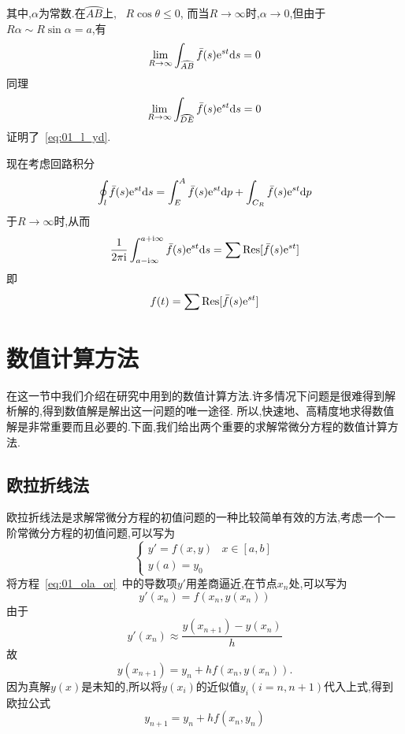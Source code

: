其中,$\alpha$为常数.在$\wideparen{AB}$上,
~$R\cos\theta\leq0$,
而当$R\to\infty$时,$\alpha\to0$,但由于$R\alpha\sim
R\sin\alpha=a$,有
\begin{equation*}
\lim_{R\to\infty}\int_{\wideparen{AB}}\bar{f}(s)\me^{st}\dif s=0
\end{equation*}
同理
\begin{equation*}
\lim_{R\to\infty}\int_{\wideparen{DE}}\bar{f}(s)\me^{st}\dif s=0
\end{equation*}
证明了~\eqref{eq:01_l_yd}.\par
现在考虑回路积分
\begin{equation*}
\oint_l\bar{f}(s)\mathrm{e}^{st}\mathrm{d} s=\int_E^A\bar{f}(s)\mathrm{e}^{st}\mathrm{d} p+\int_{C_R}\bar{f}(s)\mathrm{e}^{st}\mathrm{d} p
\end{equation*}
于$R\to\infty$时,从而
\begin{equation*}
 \dfrac{1}{2\pi\mathrm{i}}\int_{a-\mathrm{i}\infty}^{a+\mathrm{i}\infty}\bar{f}(s)\mathrm{e}^{st}\mathrm{d} s=
 \sum\mathrm{Res}[\bar{f}(s)\mathrm{e}^{st}]
\end{equation*}
即
\begin{equation}
 f(t)=\sum\mathrm{Res}[\bar{f}(s)\mathrm{e}^{st}]
\end{equation}
\section{数值计算方法}
在这一节中我们介绍在研究中用到的数值计算方法.许多情况下问题是很难得到解析解的,得到数值解是解出这一问题的唯一途径.
所以,快速地、高精度地求得数值解是非常重要而且必要的.下面,我们给出两个重要的求解常微分方程的数值计算方法.
\subsection{欧拉折线法}
欧拉折线法是求解常微分方程的初值问题的一种比较简单有效的方法,考虑一个一阶常微分方程的初值问题,可以写为
\begin{equation}\label{eq:01_ola_or}
 \begin{cases}
  y'=f(x,y)	&	x\in[a,b]	\\
  y(a)=y_0
 \end{cases}
\end{equation}
将方程~\eqref{eq:01_ola_or}~中的导数项$y'$用差商逼近,在节点$x_n$处,可以写为
\begin{equation}
 y'(x_n)=f(x_n,y(x_n))
\end{equation}
由于
\begin{equation*}
 y'(x_n)\approx\dfrac{y(x_{n+1})-y(x_n)}{h}
\end{equation*}
故
\begin{equation}
 y(x_{n+1})=y_n+hf(x_n,y(x_n)).
\end{equation}
因为真解$y(x)$是未知的,所以将$y(x_i)$的近似值$y_i(i=n,n+1)$代入上式,得到欧拉公式
\begin{equation}
 y_{n+1}=y_n+hf(x_n,y_n)
\end{equation}
